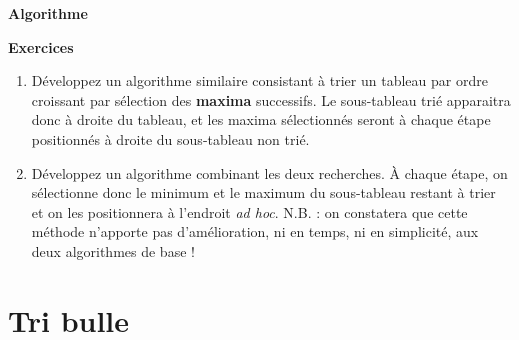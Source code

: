 		{\sffamily\bfseries\upshape
		Algorithme}
		

		\bigskip


		\bigskip

		{\sffamily\bfseries\upshape
		Exercices}

		\liststyleExercice
		\begin{enumerate}
			\item 
				Développez un algorithme similaire consistant à trier un tableau par
				ordre croissant par sélection des \textbf{maxima} successifs. Le
				sous-tableau trié apparaitra donc à droite du tableau, et les maxima
				sélectionnés seront à chaque étape positionnés à droite du sous-tableau
				non trié. 
			\item 
				Développez un algorithme combinant les deux recherches. À chaque étape,
				on sélectionne donc le minimum et le maximum du sous-tableau restant à
				trier et on les positionnera à l’endroit \textit{ad hoc}. N.B. : on
				constatera que cette méthode n’apporte pas d’amélioration, ni en temps,
				ni en simplicité, aux deux algorithmes de base !
		\end{enumerate}
		
	\section{Tri bulle}
		
